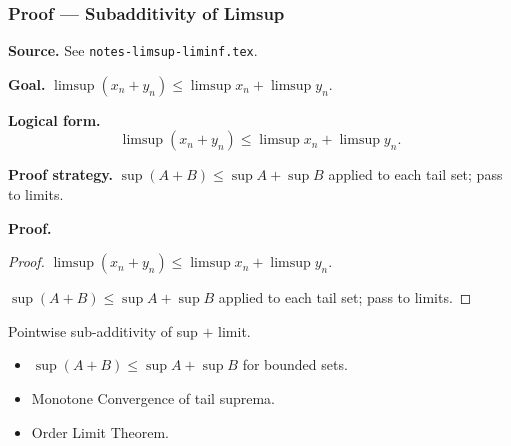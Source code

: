 
\clearpage
{}
\hypertarget{proof-RA-ABB-T-limsup-subadditive}{}

\subsubsection[Subadditivity of Limsup]{Proof --- Subadditivity of Limsup}

\bigskip

\noindent
\textbf{Source.} See \texttt{notes-limsup-liminf.tex}.

\vspace{0.75em}

\noindent
\textbf{Goal.} $\limsup(x_n + y_n) \le \limsup x_n + \limsup y_n$.

\vspace{0.75em}

\noindent
\textbf{Logical form.}
\[
  \limsup(x_n + y_n) \le \limsup x_n + \limsup y_n.
\]

\vspace{0.75em}

\noindent
\textbf{Proof strategy.} $\sup(A+B) \le \sup A + \sup B$ applied to each tail set; pass to limits.

\vspace{0.75em}

\noindent
\textbf{Proof.}
\begin{proof}
\Claim $\limsup(x_n + y_n) \le \limsup x_n + \limsup y_n$.

\Given 

\Goal 

\Strategy $\sup(A+B) \le \sup A + \sup B$ applied to each tail set; pass to limits.

\medskip


\end{proof}

\begin{remark*}
Pointwise sub-additivity of sup $+$ limit.
\end{remark*}

\begin{remark*}[Dependencies]
\begin{itemize}
  \item $\sup(A+B) \le \sup A + \sup B$ for bounded sets.
  \item Monotone Convergence of tail suprema.
  \item Order Limit Theorem.
\end{itemize}
\end{remark*}
